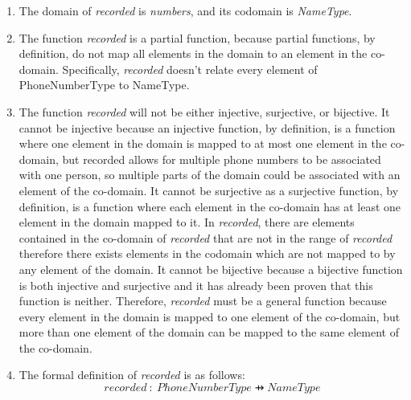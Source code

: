 \documentclass[12pt]{article}
\begin{document}
\begin{spacing}{1.5}
\begin{enumerate}
\newpage
\item The domain of \emph{recorded} is \emph{numbers}, and its codomain is \emph{NameType}.
\item The function \emph{recorded} is a partial function, because partial functions, by definition, do not map all elements in the domain to an element in the co-domain. Specifically, \emph{recorded} doesn’t relate every element of PhoneNumberType to NameType.
\item The function \emph{recorded} will not be either injective, surjective, or bijective. It cannot be injective because an injective function, by definition, is a function where one element in the domain is mapped to at most one element in the co-domain, but recorded allows for multiple phone numbers to be associated with one person, so multiple parts of the domain could be associated with an element of the co-domain. It cannot be surjective as a surjective function, by definition, is a function where each element in the co-domain has at least one element in the domain mapped to it. In \emph{recorded}, there are elements contained in the co-domain of \emph{recorded} that are not in the range of \emph{recorded} therefore there exists elements in the codomain which are not mapped to by any element of the domain. It cannot be bijective because a bijective function is both injective and surjective and it has already been proven that this function is neither. Therefore, \emph{recorded} must be a general function because every element in the domain is mapped to one element of the co-domain, but more than one element of the domain can be mapped to the same element of the co-domain.
\item The formal definition of \emph{recorded} is as follows:
\[ recorded \ : \ PhoneNumberType \pfun NameType \]


\end{enumerate}
\newpage

\end{spacing}
\end{document}
